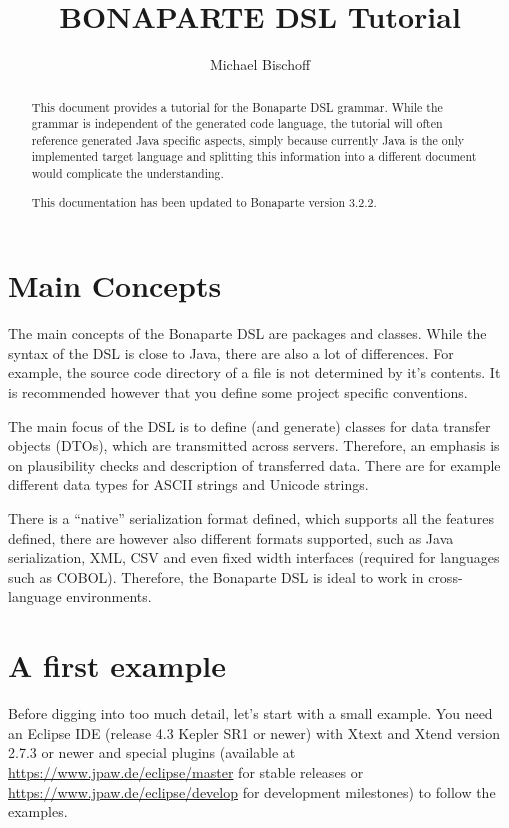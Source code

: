 \documentclass[11pt,a4paper,oneside]{article}
\title{BONAPARTE DSL Tutorial}
\author{Michael Bischoff}
\begin{document}
\maketitle
\begin{abstract}
This document provides a tutorial for the Bonaparte DSL grammar. While the grammar is independent of the generated code language,
the tutorial will often reference generated Java specific aspects, simply because currently Java is the only implemented target language
and splitting this information into a different document would complicate the understanding.

This documentation has been updated to Bonaparte version 3.2.2.
\end{abstract}

\section{Main Concepts}
The main concepts of the Bonaparte DSL are packages and classes. While the syntax of the DSL is close to Java, there are also a lot of differences.
For example, the source code directory of a file is not determined by it's contents. It is recommended however that you define some project specific
conventions.

The main focus of the DSL is to define (and generate) classes for data transfer objects (DTOs), which are transmitted across servers.
Therefore, an emphasis is on plausibility checks and description of transferred data. There are for example different data types for ASCII strings
and Unicode strings.

There is a ``native'' serialization format defined, which supports all the features defined, there are however also different formats supported,
such as Java serialization, XML, CSV and even fixed width interfaces (required for languages such as COBOL). Therefore, the Bonaparte DSL
is ideal to work in cross-language environments.


\section{A first example}
Before digging into too much detail, let's start with a small example.  You need an Eclipse IDE (release 4.3 Kepler SR1 or
newer) with Xtext and Xtend version 2.7.3 or newer and special plugins (available at \url{https://www.jpaw.de/eclipse/master}
for stable releases or \url{https://www.jpaw.de/eclipse/develop} for development milestones) to follow the examples.
\end{document}

